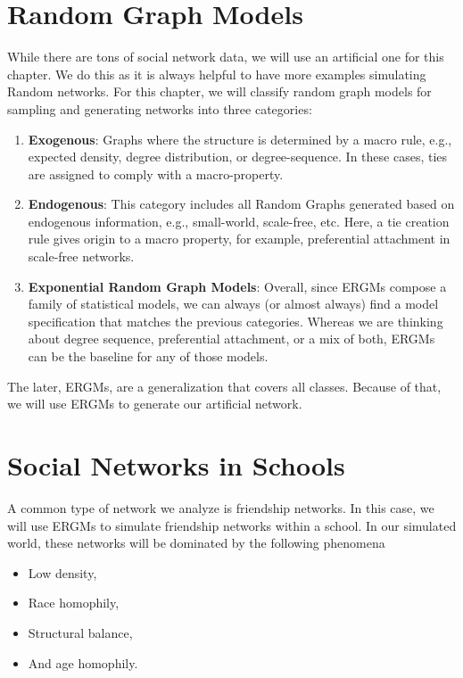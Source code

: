 \documentclass[]{book}
\providecommand{\tightlist}{%
  \setlength{\itemsep}{0pt}\setlength{\parskip}{0pt}}
\begin{document}
\hypertarget{random-graph-models}{%
\section{Random Graph Models}\label{random-graph-models}}

While there are tons of social network data, we will use an artificial one for this chapter.
We do this as it is always helpful to have more examples simulating Random
networks. For this chapter, we will classify random graph models for sampling and
generating networks into three categories:

\begin{enumerate}
\def\labelenumi{\arabic{enumi}.}
\item
  \textbf{Exogenous}: Graphs where the structure is determined by a macro rule, e.g.,
  expected density, degree distribution, or degree-sequence. In these cases,
  ties are assigned to comply with a macro-property.
\item
  \textbf{Endogenous}: This category includes all Random Graphs generated based
  on endogenous information, e.g., small-world, scale-free, etc. Here, a tie
  creation rule gives origin to a macro property, for example, preferential attachment
  in scale-free networks.
\item
  \textbf{Exponential Random Graph Models}: Overall, since ERGMs compose a family
  of statistical models, we can always (or almost always) find a model specification
  that matches the previous categories. Whereas we are thinking about degree sequence,
  preferential attachment, or a mix of both, ERGMs can be the baseline for any of
  those models.
\end{enumerate}

The later, ERGMs, are a generalization that covers all classes. Because of that,
we will use ERGMs to generate our artificial network.

\hypertarget{social-networks-in-schools}{%
\section{Social Networks in Schools}\label{social-networks-in-schools}}

A common type of network we analyze is friendship networks. In this case,
we will use ERGMs to simulate friendship networks within a school. In our
simulated world, these networks will be dominated by the following phenomena

\begin{itemize}
\tightlist
\item
  Low density,
\item
  Race homophily,
\item
  Structural balance,
\item
  And age homophily.
\end{itemize}
\end{document}
